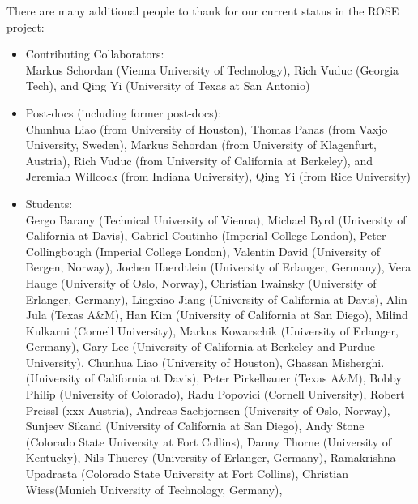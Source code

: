      There are many additional people to thank for our current status in 
the ROSE project:
\begin{itemize}
     \item Contributing Collaborators: \\
           Markus Schordan (Vienna University of Technology),
           Rich Vuduc (Georgia Tech), and
           Qing Yi (University of Texas at San Antonio)
     \item Post-docs (including former post-docs): \\
           Chunhua Liao (from University of Houston),
           Thomas Panas (from Vaxjo University, Sweden),
           Markus Schordan (from University of Klagenfurt, Austria),
           Rich Vuduc (from University of California at Berkeley), and
           Jeremiah Willcock (from Indiana University),
           Qing Yi (from Rice University)
     \item Students: \\
           Gergo Barany (Technical University of Vienna),
           Michael Byrd (University of California at Davis),
           Gabriel Coutinho (Imperial College London),
           Peter Collingbough (Imperial College London),
           Valentin David (University of Bergen, Norway),
           Jochen Haerdtlein (University of Erlanger, Germany),
           Vera Hauge (University of Oslo, Norway),
           Christian Iwainsky (University of Erlanger, Germany),
           Lingxiao Jiang (University of California at Davis),
           Alin Jula (Texas A\&M),
           Han Kim (University of California at San Diego),
           Milind Kulkarni (Cornell University),
           Markus Kowarschik (University of Erlanger, Germany),
           Gary Lee (University of California at Berkeley and Purdue University),
           Chunhua Liao (University of Houston),
           Ghassan Misherghi. (University of California at Davis),
           Peter Pirkelbauer (Texas A\&M),
           Bobby Philip (University of Colorado),
           Radu Popovici (Cornell University),
           Robert Preissl (xxx Austria),
           Andreas Saebjornsen (University of Oslo, Norway),
           Sunjeev Sikand (University of California at San Diego),
           Andy Stone (Colorado State University at Fort Collins),
           Danny Thorne (University of Kentucky), 
           Nils Thuerey (University of Erlanger, Germany), 
           Ramakrishna Upadrasta (Colorado State University at Fort Collins),
           Christian Wiess(Munich University of Technology, Germany), 

\end{itemize}
